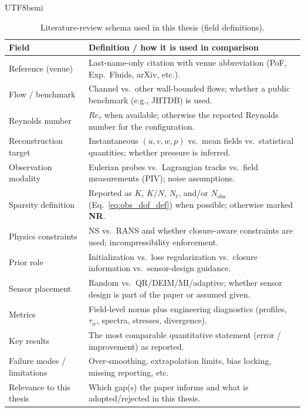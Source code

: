 \documentclass[master]{NTHUthesis}
\begin{document}
\begin{CJK*}{UTF8}{bsmi}
\begin{table}[!htbp]
    \centering
    \caption{Literature-review schema used in this thesis (field definitions).}
    \label{tab:lit_schema}
    \footnotesize
    \begin{tabularx}{\textwidth}{
        >{\raggedright\arraybackslash}p{4.2cm}
        X
    }
    \toprule
    \textbf{Field} & \textbf{Definition / how it is used in comparison} \\
    \midrule
    Reference (venue) & Last-name-only citation with venue abbreviation (PoF, Exp.\ Fluids, arXiv, etc.). \\
    Flow / benchmark & Channel vs.\ other wall-bounded flows; whether a public benchmark (e.g., JHTDB) is used. \\
    Reynolds number & $Re_\tau$ when available; otherwise the reported Reynolds number for the configuration. \\
    Reconstruction target & Instantaneous $(u,v,w,p)$ vs.\ mean fields vs.\ statistical quantities; whether pressure is inferred. \\
    Observation modality & Eulerian probes vs.\ Lagrangian tracks vs.\ field measurements (PIV); noise assumptions. \\
    Sparsity definition & Reported as $K$, $K/N$, $N_t$, and/or $N_{\text{obs}}$ (Eq.~\eqref{eq:obs_dof_def}) when possible; otherwise marked \textbf{NR}. \\
    Physics constraints & NS vs.\ RANS and whether closure-aware constraints are used; incompressibility enforcement. \\
    Prior role & Initialization vs.\ loss regularization vs.\ closure information vs.\ sensor-design guidance. \\
    Sensor placement & Random vs.\ QR/DEIM/MI/adaptive; whether sensor design is part of the paper or assumed given. \\
    Metrics & Field-level norms plus engineering diagnostics (profiles, $\tau_w$, spectra, stresses, divergence). \\
    Key results & The most comparable quantitative statement (error / improvement) as reported. \\
    Failure modes / limitations & Over-smoothing, extrapolation limits, bias locking, missing reporting, etc. \\
    Relevance to this thesis & Which gap(s) the paper informs and what is adopted/rejected in this thesis. \\
    \bottomrule
    \end{tabularx}
\end{table}
\FloatBarrier


\end{CJK*}
\end{document}
